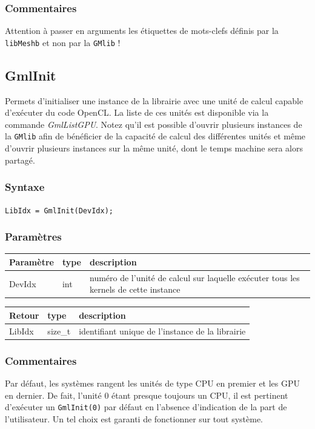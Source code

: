 \documentclass[a4paper,12pt]{article}
\begin{document}
\subsubsection*{Commentaires}
Attention à passer en arguments les étiquettes de mots-clefs définis par la {\tt libMeshb} et non par la {\tt GMlib} !


\subsection{GmlInit}

Permets d'initialiser une instance de la librairie avec une unité de calcul capable d'exécuter du code OpenCL.
La liste de ces unités est disponible via la commande \emph{GmlListGPU}.
Notez qu'il est possible d'ouvrir plusieurs instances de la {\tt GMlib} afin de bénéficier de la capacité de calcul des différentes unités et même d'ouvrir plusieurs instances sur la même unité, dont le temps machine sera alors partagé.

\subsubsection*{Syntaxe}

{\tt LibIdx = GmlInit(DevIdx);}

\subsubsection*{Paramètres}

\begin{tabular}{|m{2cm}|m{1.5cm}|m{10.5cm}|}
\hline
Paramètre  & type   & description \\
\hline
DevIdx     & int    & numéro de l'unité de calcul sur laquelle exécuter tous les kernels de cette instance \\
\hline
\end{tabular}

\medskip

\begin{tabular}{|m{2cm}|m{1.5cm}|m{10.5cm}|}
\hline
Retour     & type    & description \\
\hline
LibIdx     & size\_t & identifiant unique de l'instance de la librairie \\
\hline
\end{tabular}

\subsubsection*{Commentaires}
Par défaut, les systèmes rangent les unités de type CPU en premier et les GPU en dernier.
De fait, l'unité 0 étant presque toujours un CPU, il est pertinent d'exécuter un {\tt GmlInit(0)} par défaut en l'absence d'indication de la part de l'utilisateur. Un tel choix est garanti de fonctionner sur tout système.
\end{document}
